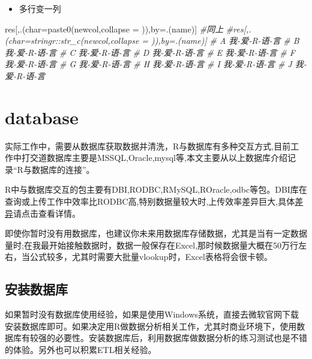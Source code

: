 \documentclass[
]{book}
\newenvironment{Shaded}{\begin{snugshade}}{\end{snugshade}}
\newcommand{\AttributeTok}[1]{\textcolor[rgb]{0.77,0.63,0.00}{#1}}
\newcommand{\CommentTok}[1]{\textcolor[rgb]{0.56,0.35,0.01}{\textit{#1}}}
\newcommand{\FunctionTok}[1]{\textcolor[rgb]{0.00,0.00,0.00}{#1}}
\newcommand{\NormalTok}[1]{#1}
\newcommand{\OtherTok}[1]{\textcolor[rgb]{0.56,0.35,0.01}{#1}}
\newcommand{\StringTok}[1]{\textcolor[rgb]{0.31,0.60,0.02}{#1}}
\providecommand{\tightlist}{%
  \setlength{\itemsep}{0pt}\setlength{\parskip}{0pt}}
\begin{document}
\begin{itemize}
\tightlist
\item
  多行变一列
\end{itemize}

\begin{Shaded}
\begin{Highlighting}[]
\NormalTok{res[,.(}\AttributeTok{char=}\FunctionTok{paste0}\NormalTok{(newcol,}\AttributeTok{collapse =} \StringTok{\textquotesingle{}{-}\textquotesingle{}}\NormalTok{)),by}\OtherTok{=}\NormalTok{.(name)]}
\CommentTok{\#同上}
\CommentTok{\#res[,.(char=stringr::str\_c(newcol,collapse = \textquotesingle{}{-}\textquotesingle{})),by=.(name)]}
\CommentTok{\# A 我{-}爱{-}R{-}语{-}言           }
\CommentTok{\# B 我{-}爱{-}R{-}语{-}言           }
\CommentTok{\# C 我{-}爱{-}R{-}语{-}言           }
\CommentTok{\# D 我{-}爱{-}R{-}语{-}言           }
\CommentTok{\# E 我{-}爱{-}R{-}语{-}言           }
\CommentTok{\# F 我{-}爱{-}R{-}语{-}言           }
\CommentTok{\# G 我{-}爱{-}R{-}语{-}言           }
\CommentTok{\# H 我{-}爱{-}R{-}语{-}言           }
\CommentTok{\# I 我{-}爱{-}R{-}语{-}言           }
\CommentTok{\# J 我{-}爱{-}R{-}语{-}言}
\end{Highlighting}
\end{Shaded}

\hypertarget{database}{%
\chapter{database}\label{database}}

实际工作中，需要从数据库获取数据并清洗，R与数据库有多种交互方式,目前工作中打交道数据库主要是MSSQL,Oracle,mysql等,本文主要从以上数据库介绍记录``R与数据库的连接''。

R中与数据库交互的包主要有DBI,RODBC,RMySQL,ROracle,odbc等包。DBI库在查询或上传工作中效率比RODBC高,特别数据量较大时,上传效率差异巨大,具体\href{https://github.com/r-dbi/odbc}{差异}请点击查看详情。

即使你暂时没有用数据库，也建议你未来用数据库存储数据，尤其是当有一定数据量时;在我最开始接触数据时，数据一般保存在Excel,那时候数据量大概在50万行左右，当公式较多，尤其时需要大批量vlookup时，Excel表格将会很卡顿。

\hypertarget{ux5b89ux88c5ux6570ux636eux5e93}{%
\section{安装数据库}\label{ux5b89ux88c5ux6570ux636eux5e93}}

如果暂时没有数据库使用经验，如果是使用Windows系统，直接去微软官网下载安装数据库即可。如果决定用R做数据分析相关工作，尤其时商业环境下，使用数据库有较强的必要性。安装数据库后，利用数据库做数据分析的练习测试也是不错的体验。另外也可以积累ETL相关经验。
\end{document}

